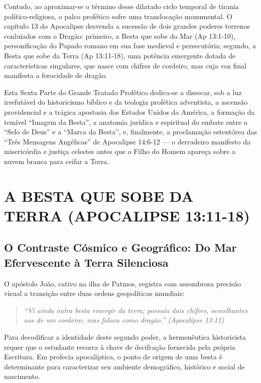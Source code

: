\documentclass[11pt,a4paper,openany]{book}
\begin{document}
Contudo, ao aproximar-se o término desse dilatado ciclo temporal de tirania político-religiosa, o palco profético sofre uma translocação monumental. O capítulo 13 do Apocalipse desvenda a sucessão de dois grandes poderes terrenos conluiados com o Dragão: primeiro, a Besta que sobe do Mar (Ap 13:1-10), personificação do Papado romano em sua fase medieval e persecutória; segundo, a Besta que sobe da Terra (Ap 13:11-18), uma potência emergente dotada de características singulares, que nasce com chifres de cordeiro, mas cuja voz final manifesta a ferocidade de dragão.

Esta Sexta Parte do Grande Tratado Profético dedica-se a dissecar, sob a luz irrefutável do historicismo bíblico e da teologia profética adventista, a ascensão providencial e a trágica apostasia dos Estados Unidos da América, a formação da temível ``Imagem da Besta'', a anatomia jurídica e espiritual do embate entre o ``Selo de Deus'' e a ``Marca da Besta'', e, finalmente, a proclamação estentórea das ``Três Mensagens Angélicas'' de Apocalipse 14:6-12 — o derradeiro manifesto da misericórdia e justiça celestes antes que o Filho do Homem apareça sobre a nuvem branca para ceifar a Terra.



\section{A BESTA QUE SOBE DA TERRA (APOCALIPSE 13:11-18)}



\subsection{O Contraste Cósmico e Geográfico: Do Mar Efervescente à Terra Silenciosa}


O apóstolo João, cativo na ilha de Patmos, registra com assombrosa precisão visual a transição entre duas ordens geopolíticas mundiais:


\begin{quote}
\itshape \textit{``Vi ainda outra besta emergir da terra; possuía dois chifres, semelhantes aos de um cordeiro, mas falava como dragão.''} (Apocalipse 13:11)
\end{quote}


Para decodificar a identidade deste segundo poder, a hermenêutica historicista requer que o estudante recorra à chave de decifração fornecida pela própria Escritura. Em profecia apocalíptica, o ponto de origem de uma besta é determinante para caracterizar seu ambiente demográfico, histórico e social de nascimento.
\end{document}
